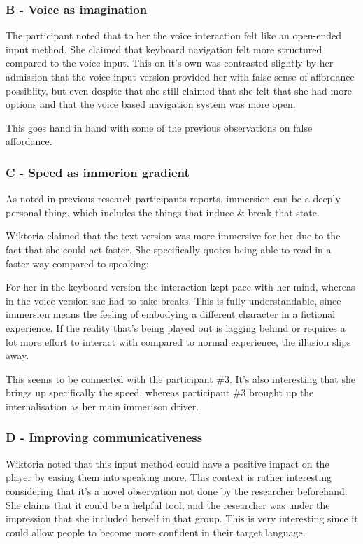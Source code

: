 \subsubsection{B - Voice as imagination}

The participant noted that to her the voice interaction felt like an open-ended input method. She claimed that keyboard navigation felt more structured compared to the voice input. This on it's own was contrasted slightly by her admission that the voice input version provided her with false sense of affordance possiblity, but even despite that she still claimed that she felt that she had more options and that the voice based navigation system was more open.

This goes hand in hand with some of the previous observations on false affordance.


\subsubsection{C - Speed as immerion gradient}

As noted in previous research participants reports, immersion can be a deeply personal thing, which includes the things that induce \& break that state. 

Wiktoria claimed that the text version was more immersive for her due to the fact that she could act faster. She specifically quotes being able to read in a faster way compared to speaking:

For her in the keyboard version the interaction kept pace with her mind, whereas in the voice version she had to take breaks. This is fully understandable, since immersion means the feeling of embodying a different character in a fictional experience. If the reality that's being played out is lagging behind or requires a lot more effort to interact with compared to normal experience, the illusion slips away. 


This seems to be connected with the participant \#3. It's also interesting that she brings up specifically the speed, whereas participant \#3 brought up the internalisation as her main immerison driver.


\subsubsection{D - Improving communicativeness}

Wiktoria noted that this input method could have a positive impact on the player by easing them into speaking more. This context is rather interesting considering that it's a novel observation not done by the researcher beforehand. She claims that it could be a helpful tool, and the researcher was under the impression that she included herself in that group. This is very interesting since it could allow people to become more confident in their target language. 

